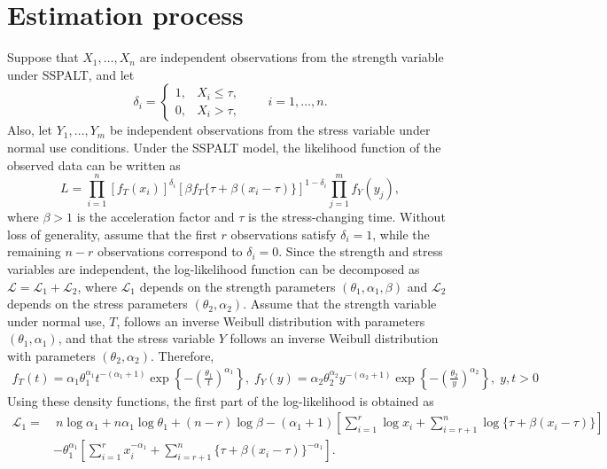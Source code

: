 \documentclass[twoside]{article}
\begin{document}
\section{Estimation process}
\vspace{-0.5cm}
Suppose that $X_1,\ldots,X_n$ are independent observations from the strength variable under SSPALT, and let
\[
\delta_i=
\begin{cases}
	1, & X_i\leq \tau,\\
	0, & X_i>\tau,
\end{cases}
\qquad i=1,\ldots,n.
\]
Also, let $Y_1,\ldots,Y_m$ be independent observations from the stress variable under normal use conditions. Under the SSPALT model, the likelihood function of the observed data can be written as
\begin{equation}\label{eq:likelihood_iw}
	L=\prod_{i=1}^{n}
	\left[f_T(x_i)\right]^{\delta_i}
	\left[\beta f_T\{\tau+\beta(x_i-\tau)\}\right]^{1-\delta_i}
	\prod_{j=1}^{m} f_Y(y_j),
\end{equation}
where $\beta>1$ is the acceleration factor and $\tau$ is the stress-changing time. Without loss of generality, assume that the first $r$ observations satisfy $\delta_i=1$, while the remaining $n-r$ observations correspond to $\delta_i=0$. Since the strength and stress variables are independent, the log-likelihood function can be decomposed as $ \mathcal{L}=\mathcal{L}_1+\mathcal{L}_2 $,
where $\mathcal{L}_1$ depends on the strength parameters $(\theta_1,\alpha_1,\beta)$ and $\mathcal{L}_2$ depends on the stress parameters $(\theta_2,\alpha_2)$. Assume that the strength variable under normal use, $T$, follows an inverse Weibull distribution with parameters $(\theta_1,\alpha_1)$, and that the stress variable $Y$ follows an inverse Weibull distribution with parameters $(\theta_2,\alpha_2)$. Therefore,
\begin{align*}
f_T(t)=\alpha_1\theta_1^{\alpha_1}t^{-(\alpha_1+1)}
\exp\left\{-\left(\frac{\theta_1}{t}\right)^{\alpha_1}\right\},\; f_Y(y)=\alpha_2\theta_2^{\alpha_2}y^{-(\alpha_2+1)}
\exp\left\{-\left(\frac{\theta_2}{y}\right)^{\alpha_2}\right\},\; y,t>0
\end{align*}
Using these density functions, the first part of the log-likelihood is obtained as
\begin{align}
	\mathcal{L}_1
	=&\ n\log\alpha_1+n\alpha_1\log\theta_1+(n-r)\log\beta -(\alpha_1+1)
	\left[
	\sum_{i=1}^{r}\log x_i+
	\sum_{i=r+1}^{n}\log\{\tau+\beta(x_i-\tau)\}
	\right] \nonumber\\
	&-\theta_1^{\alpha_1}
	\left[
	\sum_{i=1}^{r}x_i^{-\alpha_1}
	+
	\sum_{i=r+1}^{n}
	\{\tau+\beta(x_i-\tau)\}^{-\alpha_1}
	\right].
	\label{eq:L1_iw}
\end{align}
\end{document}
